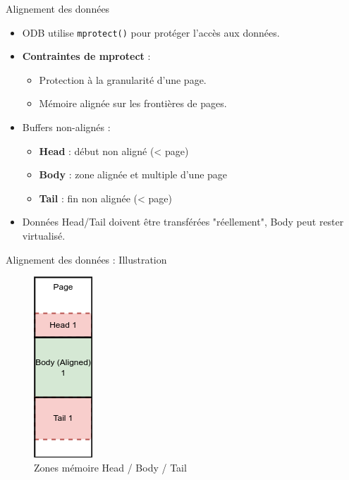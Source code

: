 \documentclass[aspectratio=43,8pt]{beamer}
\begin{document}
\begin{frame}{Alignement des données}
\begin{card}
    \begin{itemize}
        \item ODB utilise \texttt{mprotect()} pour protéger l'accès aux données.
        \item \textbf{Contraintes de mprotect} :
        \begin{itemize}
            \item Protection à la granularité d'une page.
            \item Mémoire alignée sur les frontières de pages.
        \end{itemize}
        \item Buffers non-alignés :
        \begin{itemize}
            \item \textbf{Head} : début non aligné (< page)
            \item \textbf{Body} : zone alignée et multiple d'une page
            \item \textbf{Tail} : fin non alignée (< page)
        \end{itemize}
        \item Données Head/Tail doivent être transférées "réellement", Body peut rester virtualisé.
    \end{itemize}
\end{card}
\end{frame}

\begin{frame}{Alignement des données : Illustration}
    \begin{figure}
        \centering
        \includegraphics[scale=0.4]{img2/memory_pb.png}
        \caption{Zones mémoire Head / Body / Tail}
    \end{figure}
\end{frame}
\end{document}
